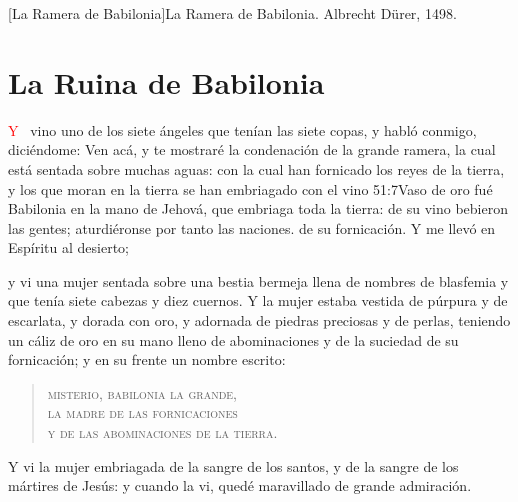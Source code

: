 [La Ramera de Babilonia]{La Ramera de Babilonia. Albrecht Dürer, 1498.}

\chapter{La Ruina de Babilonia}
\lettrine[lines=3,slope=-0.5em,loversize=0.1]{\textcolor{red}{Y}}{\ } vino uno de los siete ángeles que tenían las siete copas, y habló conmigo, diciéndome: Ven acá, y te mostraré la condenación de la grande ramera, la cual está sentada sobre muchas aguas:%
con la cual han fornicado los reyes de la tierra,%
 y los que moran en la tierra se han embriagado con el vino%
					  {51:7}{Vaso de oro fué Babilonia en la mano de Jehová, que embriaga toda la tierra: de su vino bebieron las gentes; aturdiéronse por tanto las naciones.}
 de su fornicación.%
Y me llevó en Espíritu al desierto; 

y vi una mujer sentada sobre una bestia bermeja llena de nombres de blasfemia y que tenía siete cabezas y diez cuernos. 
Y la mujer estaba vestida de púrpura y de escarlata, y dorada con oro, y adornada de piedras preciosas y de perlas,%
 teniendo un cáliz de oro en su mano lleno de abominaciones y de la suciedad de su fornicación; 
y en su frente un nombre escrito:%
\begin{verse}
\textsc{%
misterio, babilonia la grande,\\ 
la madre de las fornicaciones\\ 
y de las abominaciones de la tierra.%
}
\end{verse}
Y vi la mujer embriagada de la sangre de los santos, y de la sangre de los mártires de Jesús: y cuando la vi, quedé maravillado de grande admiración. 

